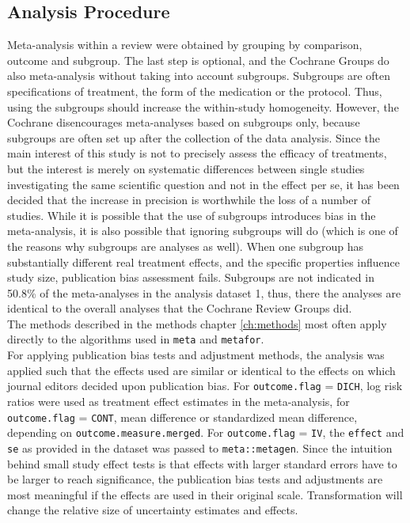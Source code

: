\documentclass[11pt,a4paper,twoside]{book}\usepackage[]{graphicx}\usepackage[]{color}
\begin{document}
\subsection{Analysis Procedure} \label{sec:procedure}
Meta-analysis within a review were obtained by grouping by comparison, outcome and subgroup. The last step is optional, and the Cochrane Groups do also meta-analysis without taking into account subgroups. Subgroups are often specifications of treatment, \eg the form of the medication or the protocol. Thus, using the subgroups should increase the within-study homogeneity. However, the Cochrane disencourages meta-analyses based on subgroups only, because subgroups are often set up after the collection of the data analysis. Since the main interest of this study is not to precisely assess the efficacy of treatments, but the interest is merely on systematic differences between single studies investigating the same scientific question and not in the effect per se, it has been decided that the increase in precision is worthwhile the loss of a number of studies. While it is possible that the use of subgroups introduces bias in the meta-analysis, it is also possible that ignoring subgroups will do (which is one of the reasons why subgroups are analyses as well). When one subgroup has substantially different real treatment effects, and the specific properties influence study size, publication bias assessment fails. Subgroups are not indicated in 50.8\% of the meta-analyses in the analysis dataset 1, thus, there the analyses are identical to the overall analyses that the Cochrane Review Groups did. \\
The methods described in the methods chapter \ref{ch:methods} most often apply directly to the algorithms used in \texttt{meta} and \texttt{metafor}. \\
For applying publication bias tests and adjustment methods, the analysis was applied such that the effects used are similar or identical to the effects on which journal editors decided upon publication bias. For \texttt{outcome.flag} = \texttt{DICH}, log risk ratios were used as treatment effect estimates in the meta-analysis, for \texttt{outcome.flag} = \texttt{CONT}, mean difference or standardized mean difference, depending on \texttt{outcome.measure.merged}. For \texttt{outcome.flag} = \texttt{IV}, the \texttt{effect} and \texttt{se} as provided in the dataset was passed to \texttt{meta::metagen}. Since the intuition behind small study effect tests is that effects with larger standard errors have to be larger to reach significance, the publication bias tests and adjustments are most meaningful if the effects are used in their original scale. Transformation will change the relative size of uncertainty estimates and effects.\\
\end{document}
